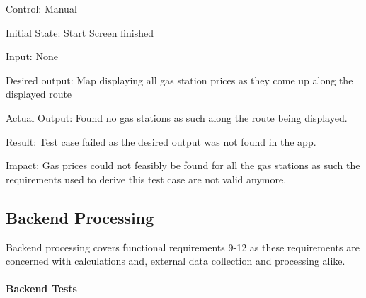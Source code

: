 \documentclass[12pt, titlepage]{article}
\begin{document}
\begin{enumerate}
Control: Manual
					
Initial State: Start Screen finished
					
Input: None

Desired output: Map displaying all gas station prices as they come up along the displayed route

Actual Output: Found no gas stations as such  along the route being displayed.

Result: Test case failed as the desired output was not found in the app.

Impact: Gas prices could not feasibly be found for all the gas stations as such the requirements used to derive this test case are not 
valid anymore.

\end{enumerate}

\subsection{Backend Processing}

Backend processing covers functional requirements 9-12 as these 
requirements are concerned with calculations and, external data collection and processing 
alike.
		
\paragraph{Backend Tests}
\end{document}
